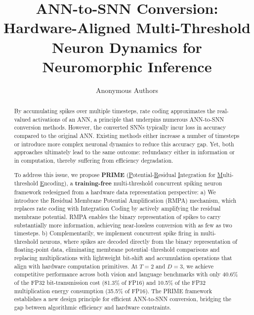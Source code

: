 \documentclass{article}
\title{  \hwrevised{A New Perspective on} ANN-to-SNN Conversion: \\ Hardware-Aligned Multi-Threshold Neuron Dynamics for Neuromorphic Inference}
\author{
  Anonymous Authors
}
\begin{document}
\maketitle

\begin{abstract}
By accumulating spikes over multiple timesteps, rate coding approximates the real-valued activations of an ANN, a principle that underpins numerous ANN-to-SNN conversion methods. However, the converted SNNs typically incur loss in accuracy compared to the original ANN.
Existing methods either increase a number of timesteps or introduce more complex neuronal dynamics to reduce this accuracy gap. Yet, both approaches ultimately lead to the same outcome: redundancy either in information or in computation, thereby suffering from efficiency degradation.

To address this issue, we propose \textbf{PRIME} (\underline{P}otential-\underline{R}esidual \underline{I}ntegration for \underline{M}ulti-threshold \underline{E}ncoding), a \textbf{training-free} multi-threshold concurrent spiking neuron framework redesigned from a hardware data representation perspective:
a) We introduce the Residual Membrane Potential Amplification (RMPA) mechanism, which replaces rate coding with Integration Coding by actively amplifying the residual membrane potential. RMPA enables the binary representation of spikes to carry substantially more information, achieving near-lossless conversion with as few as two timesteps.
b) Complementarily, we implement concurrent spike firing in multi-threshold neurons, where spikes are decoded directly from the binary representation of floating-point data, eliminating membrane potential--threshold comparisons and replacing multiplications with lightweight bit-shift and accumulation operations that align with hardware computation primitives. At $T=2$ and $D=3$, we achieve competitive performance across both vision and language benchmarks with only 40.6\% of the FP32 bit-transmission cost (81.3\% of FP16) and 10.5\% of the FP32 multiplication energy consumption (35.5\% of FP16).
The PRIME framework establishes a new design principle for efficient ANN-to-SNN conversion, bridging the gap between algorithmic efficiency and hardware constraints.
\end{abstract}










\clearpage

\end{document}
